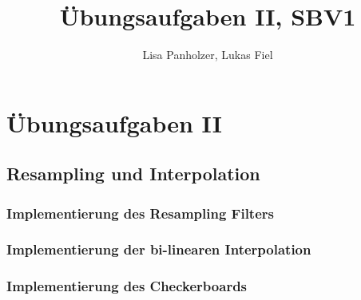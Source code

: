 \documentclass[12pt,german]{article}
\begin{document}
\title{Übungsaufgaben II, SBV1 }
\author{Lisa Panholzer, Lukas Fiel}
\maketitle


\newpage
\section{Übungsaufgaben II}
\subsection{Resampling und Interpolation}
\subsubsection{Implementierung des Resampling Filters}


\subsubsection{Implementierung der bi-linearen Interpolation}


\subsubsection{Implementierung des Checkerboards}
\end{document}
